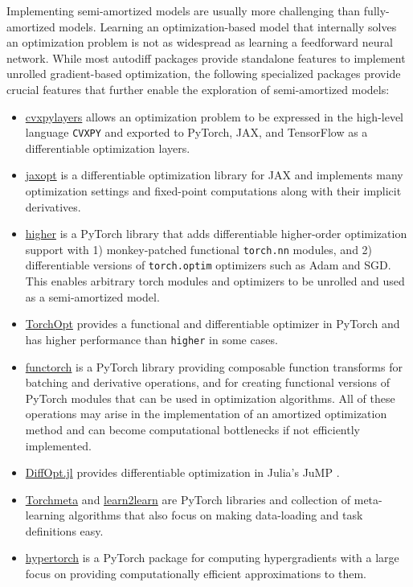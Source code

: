 Implementing semi-amortized models are usually more challenging
than fully-amortized models. Learning an optimization-based
model that internally solves an optimization problem is
not as widespread as learning a feedforward neural network.
While most autodiff packages provide standalone features to implement
unrolled gradient-based optimization, the following specialized
packages provide crucial features that further enable the
exploration of semi-amortized models:
\begin{itemize}
\item \href{https://github.com/cvxgrp/cvxpylayers}{cvxpylayers}
  \citep{agrawal2019differentiable}
  allows an optimization problem to be expressed in the
  high-level language \verb!CVXPY! \citep{diamond2016cvxpy}
  and exported to PyTorch, JAX, and TensorFlow
  as a differentiable optimization layers.
\item \href{https://github.com/google/jaxopt}{jaxopt}
  \citep{blondel2021efficient}
  is a differentiable optimization library for JAX
  and implements many optimization settings and fixed-point
  computations along with their implicit derivatives.
\item \href{https://github.com/facebookresearch/higher}{higher}
  \citep{grefenstette2019generalized}
  is a PyTorch library that adds differentiable higher-order
  optimization support with
  1) monkey-patched functional \verb!torch.nn! modules,
  and 2) differentiable versions of \verb!torch.optim!
  optimizers such as Adam and SGD.
  This enables arbitrary torch modules and optimizers
  to be unrolled and used as a semi-amortized model.
\item \href{https://github.com/metaopt/TorchOpt}{TorchOpt}
  provides a functional and differentiable optimizer in PyTorch
  and has higher performance than \verb!higher! in some cases.
\item \href{https://github.com/pytorch/functorch}{functorch}
  \citep{functorch2021} is a PyTorch library providing
  composable function transforms for batching and
  derivative operations, and for creating functional
  versions of PyTorch modules that can be used in
  optimization algorithms.
  All of these operations may arise in the implementation
  of an amortized optimization method and can become computational
  bottlenecks if not efficiently implemented.
\item \href{https://github.com/jump-dev/DiffOpt.jl}{DiffOpt.jl}
  provides differentiable optimization in Julia's JuMP
  \citep{DunningHuchetteLubin2017}.
\item \href{https://github.com/tristandeleu/pytorch-meta}{Torchmeta}
  \citep{deleu2019torchmeta} and
  \href{http://learn2learn.net}{learn2learn}
  \citep{arnold2020learn2learn}
  are PyTorch libraries and collection of meta-learning
  algorithms that also focus on making data-loading
  and task definitions easy.
\item \href{https://github.com/prolearner/hypertorch}{hypertorch}
  \citep{grazzi2020iteration}
  is a PyTorch package for computing hypergradients with a
  large focus on providing computationally efficient approximations
  to them.
\end{itemize}

